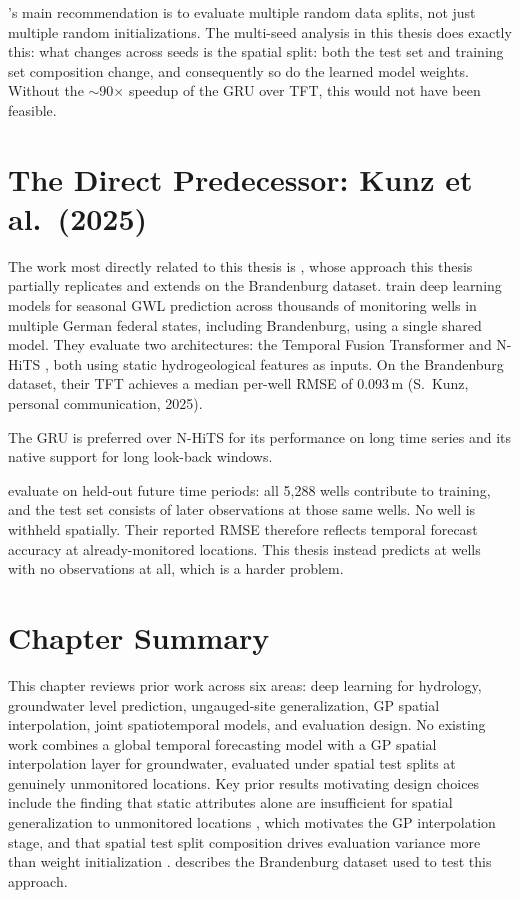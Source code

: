 \citeauthor{bouthillier2021accounting}'s main recommendation is to evaluate multiple random data splits, not just multiple random initializations. The multi-seed analysis in this thesis does exactly this: what changes across seeds is the spatial split: both the test set and training set composition change, and consequently so do the learned model weights. Without the $\sim$90$\times$ speedup of the GRU over TFT, this would not have been feasible.


\section{The Direct Predecessor: Kunz et al.\ (2025)}
\label{sec:rw_kunz}

The work most directly related to this thesis is \citet{kunz2025}, whose approach this thesis partially replicates and extends on the Brandenburg dataset. \citeauthor{kunz2025} train deep learning models for seasonal GWL prediction across thousands of monitoring wells in multiple German federal states, including Brandenburg, using a single shared model. They evaluate two architectures: the Temporal Fusion Transformer \citep{lim2021temporal} and N-HiTS \citep{challu2023nhits}, both using static hydrogeological features as inputs. On the Brandenburg dataset, their TFT achieves a median per-well RMSE of 0.093\,m (S.~Kunz, personal communication, 2025).

The GRU is preferred over N-HiTS for its performance on long time series and its native support for long look-back windows.

\citeauthor{kunz2025} evaluate on held-out future time periods: all 5{,}288 wells contribute to training, and the test set consists of later observations at those same wells. No well is withheld spatially. Their reported RMSE therefore reflects temporal forecast accuracy at already-monitored locations. This thesis instead predicts at wells with no observations at all, which is a harder problem.

\section{Chapter Summary}

This chapter reviews prior work across six areas: deep learning for hydrology, groundwater level prediction, ungauged-site generalization, GP spatial interpolation, joint spatiotemporal models, and evaluation design. No existing work combines a global temporal forecasting model with a GP spatial interpolation layer for groundwater, evaluated under spatial test splits at genuinely unmonitored locations. Key prior results motivating design choices include the finding that static attributes alone are insufficient for spatial generalization to unmonitored locations \citep{heudorfer2024challenges}, which motivates the GP interpolation stage, and that spatial test split composition drives evaluation variance more than weight initialization \citep{bouthillier2021accounting}.  describes the Brandenburg dataset used to test this approach.
